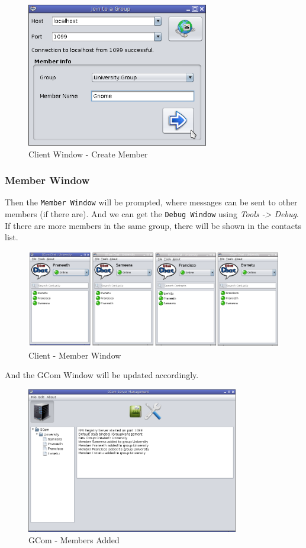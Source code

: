 \documentclass[a4paper,english,twoside]{article}
\begin{document}
\begin{figure}[h]
\begin{center}
\includegraphics[width=300px]{Client-CreateMember.png}
\caption{Client Window - Create Member}
\end{center}
\end{figure}

\newpage
\subsubsection{Member Window}
\noindent
Then the \texttt{Member Window} will be prompted, where messages can be sent to other members (if there are). And we can get the \texttt{Debug Window} using \textit{Tools -> Debug}.
\noindent
If there are more members in the same group, there will be shown in the contacts list.

\begin{figure}[h]
\begin{center}
\includegraphics[width=490px]{Client-Chats.png}
\caption{Client - Member Window}
\end{center}
\end{figure}

\noindent
And the GCom Window will be updated accordingly.
\begin{figure}[h]
\begin{center}
\includegraphics[width=350px]{GCom-MembersAdded.png}
\caption{GCom - Members Added}
\end{center}
\end{figure}
\end{document}
